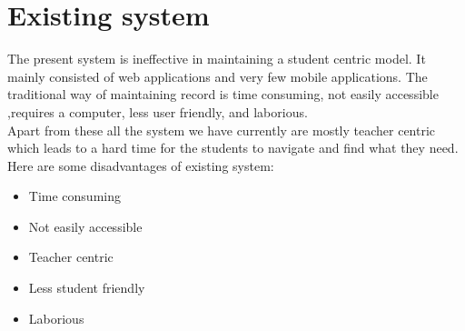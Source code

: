 \section{Existing system}

The present system is ineffective in maintaining a student centric model. It mainly consisted of web applications and very few mobile applications. The traditional way of maintaining record is time consuming, not easily accessible ,requires a computer, less user friendly, and laborious.\\

Apart from these all the system we have currently are mostly teacher centric which leads to a hard time for the students to navigate and find what they need.\\

Here are some disadvantages of existing system:
\begin{itemize}
\item Time consuming
\item Not easily accessible
\item Teacher centric
\item Less student friendly
\item Laborious
\end{itemize}

